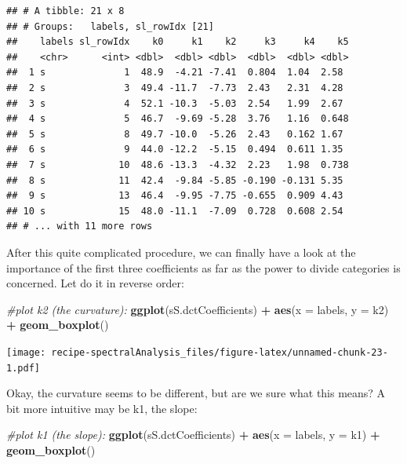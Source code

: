 \documentclass[]{book}
\newenvironment{Shaded}{\begin{snugshade}}{\end{snugshade}}
\newcommand{\CommentTok}[1]{\textcolor[rgb]{0.56,0.35,0.01}{\textit{#1}}}
\newcommand{\DataTypeTok}[1]{\textcolor[rgb]{0.13,0.29,0.53}{#1}}
\newcommand{\KeywordTok}[1]{\textcolor[rgb]{0.13,0.29,0.53}{\textbf{#1}}}
\newcommand{\NormalTok}[1]{#1}
\newcommand{\OperatorTok}[1]{\textcolor[rgb]{0.81,0.36,0.00}{\textbf{#1}}}
\newcommand{\StringTok}[1]{\textcolor[rgb]{0.31,0.60,0.02}{#1}}
\begin{document}
\begin{verbatim}
## # A tibble: 21 x 8
## # Groups:   labels, sl_rowIdx [21]
##    labels sl_rowIdx    k0     k1    k2     k3     k4    k5
##    <chr>      <int> <dbl>  <dbl> <dbl>  <dbl>  <dbl> <dbl>
##  1 s              1  48.9  -4.21 -7.41  0.804  1.04  2.58 
##  2 s              3  49.4 -11.7  -7.73  2.43   2.31  4.28 
##  3 s              4  52.1 -10.3  -5.03  2.54   1.99  2.67 
##  4 s              5  46.7  -9.69 -5.28  3.76   1.16  0.648
##  5 s              8  49.7 -10.0  -5.26  2.43   0.162 1.67 
##  6 s              9  44.0 -12.2  -5.15  0.494  0.611 1.35 
##  7 s             10  48.6 -13.3  -4.32  2.23   1.98  0.738
##  8 s             11  42.4  -9.84 -5.85 -0.190 -0.131 5.35 
##  9 s             13  46.4  -9.95 -7.75 -0.655  0.909 4.43 
## 10 s             15  48.0 -11.1  -7.09  0.728  0.608 2.54 
## # ... with 11 more rows
\end{verbatim}

After this quite complicated procedure, we can finally have a look at the importance of the first three coefficients as far as the power to divide categories is concerned. Let do it in reverse order:

\begin{Shaded}
\begin{Highlighting}[]
\CommentTok{#plot k2 (the curvature):}
\KeywordTok{ggplot}\NormalTok{(sS.dctCoefficients) }\OperatorTok{+}
\StringTok{  }\KeywordTok{aes}\NormalTok{(}\DataTypeTok{x =}\NormalTok{ labels, }\DataTypeTok{y =}\NormalTok{ k2) }\OperatorTok{+}
\StringTok{  }\KeywordTok{geom_boxplot}\NormalTok{()}
\end{Highlighting}
\end{Shaded}

\texttt{[image: recipe-spectralAnalysis\_files/figure-latex/unnamed-chunk-23-1.pdf]}

Okay, the curvature seems to be different, but are we sure what this means?
A bit more intuitive may be k1, the slope:

\begin{Shaded}
\begin{Highlighting}[]
\CommentTok{#plot k1 (the slope):}
\KeywordTok{ggplot}\NormalTok{(sS.dctCoefficients) }\OperatorTok{+}
\StringTok{  }\KeywordTok{aes}\NormalTok{(}\DataTypeTok{x =}\NormalTok{ labels, }\DataTypeTok{y =}\NormalTok{ k1) }\OperatorTok{+}
\StringTok{  }\KeywordTok{geom_boxplot}\NormalTok{()}
\end{Highlighting}
\end{Shaded}
\end{document}
